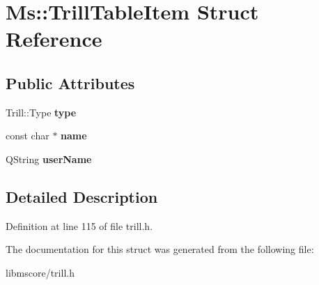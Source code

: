 \hypertarget{struct_ms_1_1_trill_table_item}{}\section{Ms\+:\+:Trill\+Table\+Item Struct Reference}
\label{struct_ms_1_1_trill_table_item}
\subsection*{Public Attributes}
\begin{DoxyCompactItemize}
\item 
\mbox{\label{struct_ms_1_1_trill_table_item_a586e40965a0ad1f552e06cbf41ba613c}} 
Trill\+::\+Type {\bfseries type}
\item 
\mbox{\label{struct_ms_1_1_trill_table_item_a917033cb35784be61ab148334deb9630}} 
const char $\ast$ {\bfseries name}
\item 
\mbox{\label{struct_ms_1_1_trill_table_item_a742eb2d635a3325176c0ecf891a0c749}} 
Q\+String {\bfseries user\+Name}
\end{DoxyCompactItemize}


\subsection{Detailed Description}


Definition at line 115 of file trill.\+h.



The documentation for this struct was generated from the following file\+:\begin{DoxyCompactItemize}
\item 
libmscore/trill.\+h\end{DoxyCompactItemize}
